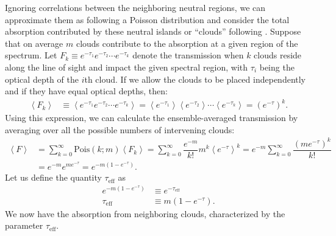 Ignoring correlations between the neighboring neutral regions, we can approximate them as following a Poisson distribution and consider the total absorption contributed by these neutral islands or ``clouds'' following
\citet{Zuo}. Suppose that on average $m$ clouds contribute to the absorption at a given region of the spectrum.
Let $F_k \equiv e^{-\tau_1}e^{-\tau_2}\cdots e^{-\tau_k}$ denote the transmission when $k$ clouds reside along the line of sight and impact the given spectral region, with $\tau_i$ being the optical depth of the $i$th cloud. If we allow the clouds to be placed independently and if they have equal optical depths, then:
\begin{align}
\left\langle F_{k} \right\rangle &\equiv \left\langle e^{-\tau_1}e^{-\tau_2}\cdots e^{-\tau_k} \right\rangle = \left\langle e^{-\tau_1} \right\rangle \left\langle e^{-\tau_2} \right\rangle \cdots \left\langle e^{-\tau_k} \right\rangle = \left( e^{-\tau} \right)^{k}.
\end{align}
Using this expression, we can calculate the ensemble-averaged transmission by averaging over all the possible numbers of intervening clouds:
\begin{align}
\left\langle F \right\rangle &= \sum_{k = 0}^{\infty} \text{Pois}(k;m) \left\langle F_k \right\rangle = \sum_{k = 0}^{\infty} \dfrac{e^{-m}}{k!}m^{k}\left\langle e^{-\tau}\right\rangle^{k} = e^{-m}\sum_{k = 0}^{\infty} \dfrac{\left(me^{-\tau}\right)^{k}}{k!} \\
&= e^{-m}e^{me^{-\tau}} = e^{-m\left(1-e^{-\tau}\right)}.
\end{align}
Let us define the quantity $\tau_{\text{eff}}$ as
\begin{align}
e^{-m\left(1-e^{-\tau}\right)} &\equiv e^{-\tau_{\text{eff}}} \\
\tau_{\text{eff}} &\equiv m\left(1-e^{-\tau}\right).
\end{align}
We now have the absorption from neighboring clouds, characterized by the parameter $\tau_{\text{eff}}$. 

